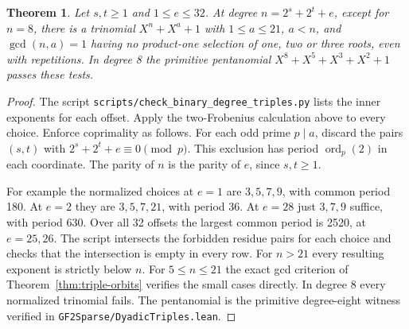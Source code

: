 \documentclass[11pt]{article}
\newtheorem{theorem}{Theorem}
\newcommand{\ord}{\operatorname{ord}}
\begin{document}
\begin{theorem}\label{thm:normalized-offsets}
Let \(s,t\ge1\) and \(1\le e\le32\). At degree \(n=2^s+2^t+e\),
except for \(n=8\), there is a trinomial \(X^n+X^a+1\) with
\(1\le a\le21\), \(a<n\), and \(\gcd(n,a)=1\) having no product-one
selection of one, two or three roots, even with repetitions.
In degree 8 the primitive pentanomial \(X^8+X^5+X^3+X^2+1\)
passes these tests.
\end{theorem}
\begin{proof}
The script \nolinkurl{scripts/check_binary_degree_triples.py}
lists the inner exponents for each offset. Apply the
two-Frobenius calculation above to every choice. Enforce coprimality as
follows. For each odd prime \(p\mid a\), discard the pairs \((s,t)\)
with \(2^s+2^t+e\equiv0\pmod p\). This exclusion has period
\(\ord_p(2)\) in each coordinate. The parity of \(n\) is the parity of
\(e\), since \(s,t\ge1\).

For example the normalized choices at \(e=1\) are \(3,5,7,9\), with
common period 180. At \(e=2\) they are \(3,5,7,21\), with period 36.
At \(e=28\) just \(3,7,9\) suffice, with period 630.
Over all 32 offsets the largest common period is 2520, at \(e=25,26\).
The script intersects the forbidden residue pairs for each choice
and checks that the intersection is empty in every row.
For \(n>21\) every resulting exponent is strictly below \(n\).
For \(5\le n\le21\) the exact gcd criterion of
Theorem~\ref{thm:triple-orbits} verifies the small cases directly.
In degree 8 every normalized trinomial fails. The pentanomial is the
primitive degree-eight witness verified in
\nolinkurl{GF2Sparse/DyadicTriples.lean}.
\end{proof}
\end{document}
